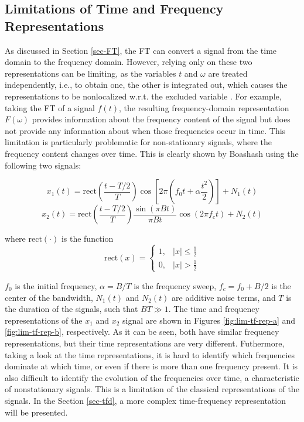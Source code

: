 \subsection{Limitations of Time and Frequency Representations} \label{sec-lim-tf-r}

As discussed in Section \ref{sec-FT}, the FT can convert a signal from the time domain to the frequency domain. However, relying only on these two representations can be limiting, as the variables $t$ and $\omega$ are treated independently, i.e., to obtain one, the other is integrated out, which causes the representations to be nonlocalized w.r.t. the excluded variable \cite{Boashash2016Chapter1TimeFrequency}. For example, taking the FT of a signal $f(t)$, the resulting frequency-domain representation $F(\omega)$ provides information about the frequency content of the signal but does not provide any information about when those frequencies occur in time. This limitation is particularly problematic for non-stationary signals, where the frequency content changes over time. This is clearly shown by Boashash \cite{Boashash2016ChapterITimeFrequency} using the following two signals:

\begin{equation}
    x_{1}(t) = \text{rect}\left(\frac{t-T/2}{T}\right)\cos \left[2\pi \left(f_0t + \alpha \frac{t^2}{2}\right)\right] + N_1(t)
    \label{eq-xA}
\end{equation}
\begin{equation}
    x_{2}(t) = \text{rect}\left(\frac{t-T/2}{T}\right)\frac{\sin\left(\pi B t\right)}{\pi B t} \cos \left(2\pi f_c t\right) + N_2(t)
    \label{eq-xB}
\end{equation}

\noindent where $\text{rect}(\cdot)$ is the function
\begin{equation}
    \text{rect}(x) = \begin{cases}
        1, & |x| \leq \frac{1}{2} \\
        0, & |x| > \frac{1}{2}
    \end{cases}
\end{equation}

\noindent $f_0$ is the initial frequency, $\alpha=B/T$ is the frequency sweep, $f_c = f_0 + B/2$ is the center of the bandwidth, $N_1(t)$ and $N_2(t)$ are additive noise terms, and $T$ is the duration of the signals, such that $BT \gg 1$. The time and frequency representations of the $x_1$ and $x_2$ signal are shown in Figures \ref{fig:lim-tf-rep-a} and \ref{fig:lim-tf-rep-b}, respectively. As it can be seen, both have similar frequency representations, but their time representations are very different. Futhermore, taking a look at the time representations, it is hard to identify which frequencies dominate at which time, or even if there is more than one frequency present. It is also difficult to identify the evolution of the frequencies over time, a characteristic of nonstationary signals. This is a limitation of the classical representations of the signals. In the Section \ref{sec-tfd}, a more complex time-frequency representation will be presented.

